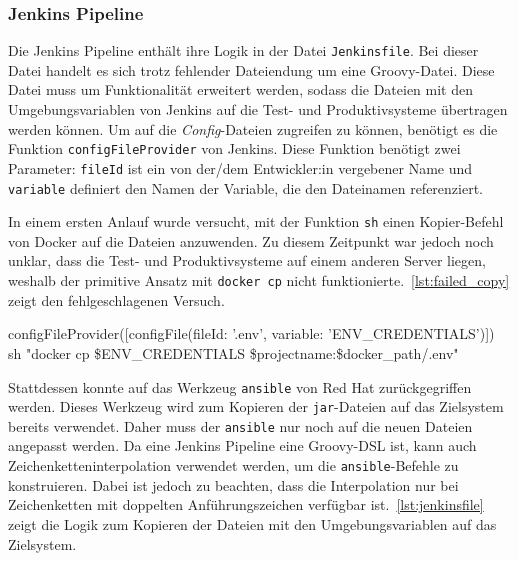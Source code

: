 \subsubsection{Jenkins Pipeline}

Die Jenkins Pipeline enthält ihre Logik in der Datei \texttt{Jenkinsfile}. Bei dieser Datei handelt es sich trotz fehlender Dateiendung um eine Groovy-Datei. Diese Datei muss um Funktionalität erweitert werden, sodass die Dateien mit den Umgebungsvariablen von Jenkins auf die Test- und Produktivsysteme übertragen werden können. Um auf die \textit{Config}-Dateien zugreifen zu können, benötigt es die Funktion \texttt{configFileProvider} von Jenkins. Diese Funktion benötigt zwei Parameter: \texttt{fileId} ist ein von der/dem Entwickler:in vergebener Name und \texttt{variable} definiert den Namen der Variable, die den Dateinamen referenziert.

In einem ersten Anlauf wurde versucht, mit der Funktion \texttt{sh} einen Kopier-Befehl von Docker auf die Dateien anzuwenden. Zu diesem Zeitpunkt war jedoch noch unklar, dass die Test- und Produktivsysteme auf einem anderen Server liegen, weshalb der primitive Ansatz mit \texttt{docker cp} nicht funktionierte.~\autoref{lst:failed_copy} zeigt den fehlgeschlagenen Versuch.

\begin{Groovy}[numbers=none, caption={Gescheiterter Versuch, die Umgebungsvariablen in den Docker Container zu kopieren.}, label={lst:failed_copy}]
configFileProvider([configFile(fileId: '.env', variable: 'ENV_CREDENTIALS')]) {
    sh "docker cp \${ENV_CREDENTIALS} \$projectname:\$docker_path/.env"
}
\end{Groovy}

Stattdessen konnte auf das Werkzeug \texttt{ansible} von Red Hat zurückgegriffen werden. Dieses Werkzeug wird zum Kopieren der \texttt{jar}-Dateien auf das Zielsystem bereits verwendet. Daher muss der \texttt{ansible} nur noch auf die neuen Dateien angepasst werden. Da eine Jenkins Pipeline eine Groovy-DSL ist, kann auch Zeichenketteninterpolation verwendet werden, um die \texttt{ansible}-Befehle zu konstruieren. Dabei ist jedoch zu beachten, dass die Interpolation nur bei Zeichenketten mit doppelten Anführungszeichen verfügbar ist.~\autoref{lst:jenkinsfile} zeigt die Logik zum Kopieren der Dateien mit den Umgebungsvariablen auf das Zielsystem.

